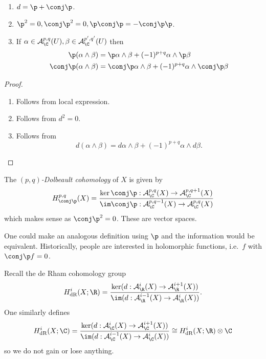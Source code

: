 \documentclass[a4paper]{article}
\newcommand{\w}{\wedge} %
\begin{document}
\begin{lemma}\leavevmode
  \begin{enumerate}
  \item \(d = \p + \conj \p\).
  \item \(\p^2 = 0, \conj \p^2 = 0, \p \conj \p = - \conj \p \p\).
  \item If \(\alpha \in \mathcal A_\C^{p, q}(U), \beta \in \mathcal A_\C^{p', q'}(U)\) then
    \begin{align*}
      \p(\alpha \w \beta) &= \p \alpha \w \beta + (-1)^{p + q} \alpha \w \p \beta \\
      \conj \p(\alpha \w \beta) &= \conj \p \alpha \w \beta + (-1)^{p + q} \alpha \w \conj \p \beta \\
    \end{align*}
  \end{enumerate}
\end{lemma}

\begin{proof}\leavevmode
  \begin{enumerate}
  \item Follows from local expression.
  \item Follows from \(d^2 = 0\).
  \item Follows from
    \[
      d(\alpha \w \beta) = d\alpha \w \beta + (-1)^{p + q} \alpha \w d \beta.
    \]
  \end{enumerate}
\end{proof}

\begin{definition}
  The \emph{\((p, q)\)-Dolbeault cohomology} of \(X\) is given by
  \[
    H_{\conj \p}^{p, q}(X) = \frac{\ker \conj \p: \mathcal A_\C^{p, q}(X) \to \mathcal A_\C^{p, q + 1}(X)}{\im \conj \p: \mathcal A_\C^{p, q - 1}(X) \to \mathcal A_\C^{p, q}(X)}
  \]
  which makes sense as \(\conj \p^2 = 0\). These are vector spaces.
\end{definition}

\begin{remark}
  One could make an analogous definition using \(\p\) and the information would be equivalent. Historically, people are interested in holomorphic functions, i.e.\ \(f\) with \(\conj \p f = 0\).
\end{remark}

Recall the de Rham cohomology group
\[
  H_{\text{dR}}^i(X; \R) = \frac{\ker (d: \mathcal A_\R^i(X) \to \mathcal A_\R^{i + 1}(X))}{\im (d: \mathcal A_\R^{i - 1}(X) \to \mathcal A_\R^i(X))}.
\]
One similarly defines
\[
  H_{\text{dR}}^i(X; \C) = \frac{\ker (d: \mathcal A_\C^i(X) \to \mathcal A_\C^{i + 1}(X))}{\im (d: \mathcal A_\C^{i - 1}(X) \to \mathcal A_\C^i(X))}
  \cong H_{\text{dR}}^i(X; \R) \otimes \C
\]
so we do not gain or lose anything.
\end{document}
